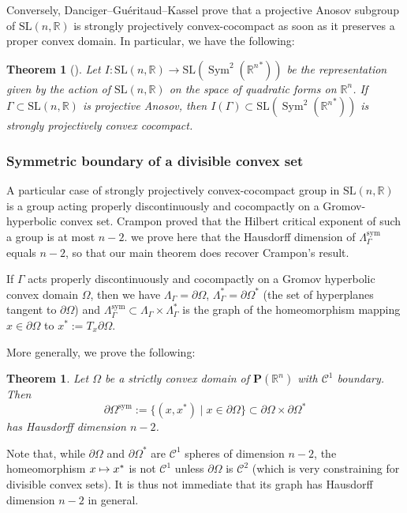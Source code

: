 \documentclass[11pt]{article}
\numberwithin{equation}{section}
\newcommand{\sym}{\mathrm{sym}}
\newcommand\mto{\mathchoice{\longmapsto}{\mapsto}{\mapsto}{\mapsto}}
\newtheorem{theorem}[theo]{Theorem}
\theoremstyle{definition}
\newcommand{\proj}{\mathbf{P}}
\newcommand{\R}{\mathbb{R}}
\newcommand{\SL}{\mathrm{SL}}
\DeclareMathOperator{\Sym}{Sym}
\begin{document}
Conversely, Danciger--Guéritaud--Kassel prove that a projective Anosov subgroup of $\SL(n,\R)$ is strongly projectively convex-cocompact as soon as it preserves a proper convex domain. In particular, we have the following:

\begin{theorem}[\cite{DGK}] \label{th - projective anosov are convex cocompact}
Let $I: \SL(n,\R) \to \SL(\Sym^2({\R^n}^*))$ be the representation given by the action of $\SL(n,\R)$ on the space of quadratic forms on $\R^n$. If~$\Gamma \subset \SL(n,\R)$ is projective Anosov, then $I(\Gamma) \subset \SL(\Sym^2({\R^n}^*))$ is strongly projectively convex cocompact.
\end{theorem}

\subsubsection{Symmetric boundary of a divisible convex set}

A particular case of strongly projectively convex-cocompact group in $\SL(n,\R)$ is a group acting properly discontinuously and cocompactly on a Gromov-hyperbolic convex set. Crampon proved that the Hilbert critical exponent of such a group is at most $n-2$. we prove here that the Hausdorff dimension of $\Lambda_\Gamma^{\sym}$ equals $n-2$, so that our main theorem does recover Crampon's result.

If $\Gamma$ acts properly discontinuously and cocompactly on a Gromov hyperbolic convex domain $\Omega$, then we have $\Lambda_\Gamma = \partial \Omega$, $\Lambda_\Gamma^* = \partial \Omega^*$ (the set of hyperplanes tangent to $\partial\Omega$) and $\Lambda^{\sym}_\Gamma \subset \Lambda_\Gamma \times \Lambda_\Gamma^*$ is the graph of the homeomorphism mapping $x\in \partial\Omega$ to $x^* := T_x \partial \Omega$.

More generally, we prove the following:
\begin{theorem} \label{theo - HD Symmetric boundary convex}
Let $\Omega$ be a strictly convex domain of $\proj(\R^n)$ with $\mathcal C^1$ boundary. Then
\[\partial \Omega^{\sym} := \{(x,x^*)\mid x\in \partial \Omega\} \subset \partial \Omega \times \partial \Omega^*\]
has Hausdorff dimension $n-2$.
\end{theorem}

Note that, while $\partial \Omega$ and $\partial\Omega^*$ are $\mathcal C^1$ spheres of dimension $n-2$, the homeomorphism $x\mto x^*$ is not $\mathcal C^1$ unless $\partial \Omega$ is $\mathcal C^2$ (which is very constraining for divisible convex sets). It is thus not immediate that its graph has Hausdorff dimension $n-2$ in general.
\end{document}
